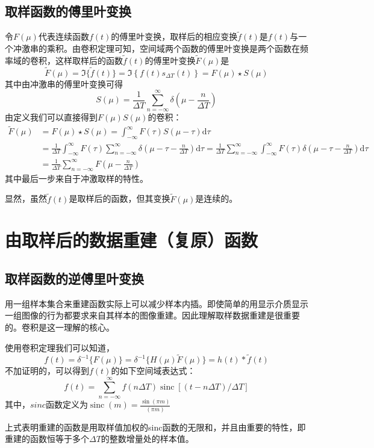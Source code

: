 \documentclass[UTF8,a4paper]{ctexart}
\begin{document}
\subsection{取样函数的傅里叶变换}
令$F(\mu)$代表连续函数$f(t)$的傅里叶变换，取样后的相应变换$\tilde{f}(t)$是$f(t)$与一个冲激串的乘积。由卷积定理可知，空间域两个函数的傅里叶变换是两个函数在频率域的卷积，这样取样后的函数$\tilde{f}(t)$的傅里叶变换$\tilde{F}(\mu)$是
\begin{equation}\tilde{F}(\mu)=\Im\{\tilde{f}(t)\}=\Im\left\{f(t) s_{\Delta T}(t)\right\}=F(\mu) \star S(\mu)\end{equation}
其中由冲激串的傅里叶变换可得
\begin{equation}S(\mu)=\frac{1}{\Delta T} \sum_{n=-\infty}^{\infty} \delta\left(\mu-\frac{n}{\Delta T}\right)\end{equation}
由定义我们可以直接得到$F(\mu)$$S(\mu)$的卷积：
\begin{equation}\begin{aligned}
\tilde{F}(\mu) &=F(\mu) \star S(\mu)=\int_{-\infty}^{\infty} F(\tau) S(\mu-\tau) \mathrm{d} \tau \\
&=\frac{1}{\Delta T} \int_{-\infty}^{\infty} F(\tau) \sum_{n=-\infty}^{\infty} \delta\left(\mu-\tau-\frac{n}{\Delta T}\right) \mathrm{d} \tau=\frac{1}{\Delta T} \sum_{n=-\infty}^{\infty} \int_{-\infty}^{\infty} F(\tau) \delta\left(\mu-\tau-\frac{n}{\Delta T}\right) \mathrm{d} \tau \\
&=\frac{1}{\Delta T} \sum_{n=-\infty}^{\infty} F\left(\mu-\frac{n}{\Delta T}\right)
\end{aligned}\end{equation}
其中最后一步来自于冲激取样的特性。\par
显然，虽然$\tilde{f}(t)$是取样后的函数，但其变换$\tilde{F}(\mu)$是连续的。
\section{由取样后的数据重建（复原）函数}
\subsection{取样函数的逆傅里叶变换}
用一组样本集合来重建函数实际上可以减少样本内插。即使简单的用显示介质显示一组图像的行为都要求来自其样本的图像重建。因此理解取样数据重建是很重要的。卷积是这一理解的核心。\par
使用卷积定理我们可以知道，
\begin{equation}f(t)=\delta^{-1}\{F(\mu)\}=\delta^{-1}\{H(\mu) \tilde{F}(\mu)\}=h(t) * \tilde{f}(t)\end{equation}
不加证明的，可以得到$f(t)$的如下空间域表达式：
\begin{equation}f(t)=\sum_{n=-\infty}^{\infty} f(n \Delta T) \operatorname{sinc}[(t-n \Delta T) / \Delta T]\end{equation}
其中，$sinc$函数定义为$\operatorname{sinc}(m)=\frac{\sin (\pi m)}{(\pi m)}$\par
上式表明重建的函数是用取样值加权的sinc函数的无限和，并且由重要的特性，即重建的函数恒等于多个$\Delta T$的整数增量处的样本值。
\end{document}
